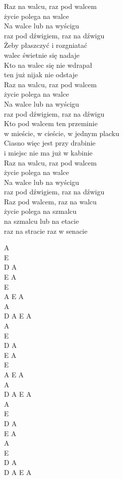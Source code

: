 \begin{text}
Raz na walcu, raz pod walcem\\
życie polega na walce\\
Na walce lub na wyścigu\\
raz pod dźwigiem, raz na dźwigu\\

Żeby płaszczyć i rozgniatać\\
walec świetnie się nadaje\\
Kto na walec się nie wdrapał\\
ten już nijak nie odstaje\\

Raz na walcu, raz pod walcem\\
życie polega na walce\\
Na walce lub na wyścigu\\
raz pod dźwigiem, raz na dźwigu\\

Kto pod walcem ten przeminie\\
w mieście, w cieście, w jednym placku\\
Ciasno więc jest przy drabinie\\
i miejsc nie ma już w kabinie\\

Raz na walcu, raz pod walcem\\
życie polega na walce\\
Na walce lub na wyścigu\\
raz pod dźwigiem, raz na dźwigu\\

Raz pod walcem, raz na walcu\\
życie polega na szmalcu\\
na szmalcu lub na etacie\\
raz na stracie raz w senacie
\end{text}
\begin{chord}
A\\
E\\
D A\\
E A\\

E\\
A E A\\
A\\
D A E A\\

A\\
E\\
D A\\
E A\\

E\\
A E A\\
A\\
D A E A\\

A\\
E\\
D A\\
E A\\

A\\
E\\
D A\\
D A E A\\
\end{chord}
